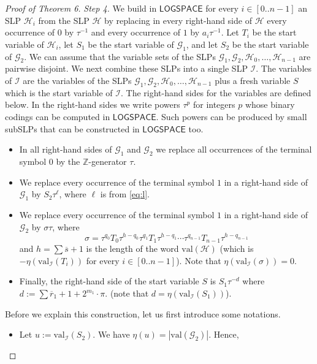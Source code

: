 \documentclass[10pt,a4paper]{article}
\newcommand{\ccinterval}[2]{[{#1}..{#2}]}
\newcommand{\cointerval}[2]{[{#1}..{#2}-1]}
\newcommand{\val}{\mathrm{val}}
\renewcommand{\L}{\ensuremath{\mathsf{LOGSPACE}}\xspace}
\begin{document}
\begin{proof}[Proof of Theorem 6]
\medskip
\noindent
{\em Step 4.}
We build in \L for every $i \in \ccinterval{0}{n-1}$ an
SLP $\mathcal{H}_i$ 
from the SLP $\mathcal{H}$ by replacing in every right-hand side of $\mathcal{H}$ 
every occurrence of $0$  by $\tau^{-1}$ and
every occurrence of $1$  by $a_i \tau^{-1}$.
Let $T_i$ be the start variable of $\mathcal{H}_i$, let $S_1$ be the start variable of $\mathcal{G}_1$, and let
$S_2$ be the start variable of $\mathcal{G}_2$.
We can assume that the variable sets of the SLPs $\mathcal{G}_1, \mathcal{G}_2, \mathcal{H}_0, \ldots, \mathcal{H}_{n-1}$
are pairwise disjoint.  We next combine these SLPs into a single SLP $\mathcal{I}$.
The variables of $\mathcal{I}$ are the variables of 
the SLPs $\mathcal{G}_1, \mathcal{G}_2,  \mathcal{H}_0, \ldots, \mathcal{H}_{n-1}$ plus a fresh variable $S$ which is the start
variable of $\mathcal{I}$. The right-hand sides for the variables are defined below. In the right-hand sides 
we write powers $\tau^p$ for integers $p$
whose binary codings can be computed in \L. Such powers can be produced by small subSLPs that can be constructed in \L too.
\begin{itemize}
\item In all right-hand sides of $\mathcal{G}_1$  and $\mathcal{G}_2$ 
we replace all occurrences of the terminal symbol $0$ by the $\mathbb{Z}$-generator $\tau$. 
\item We replace every
occurrence of the terminal symbol $1$ in a right-hand side of $\mathcal{G}_1$ by $S_2 \tau^\ell$,
where $\ell$ is from \eqref{eq:l}.
\item We  replace every
occurrence of the terminal symbol $1$ in a right-hand side of $\mathcal{G}_2$ by
$\sigma \tau$, where
\begin{equation} \label{eq-sigma}
\sigma = \tau^{q_{0}} T_0 \tau^{h-q_{0}} \tau^{q_{1}} T_1 \tau^{h-q_{1}} \cdots \tau^{q_{n-1}} T_{n-1} \tau^{h-q_{n-1}}
\end{equation}
and $h = \sum \overline{s}+1$ is the length of the word
$\val(\mathcal{H})$ (which is $-\eta(\val_{\mathcal{I}}(T_i))$ for every  $i \in\cointerval{0}{n}$).
Note that $\eta(\val_{\mathcal{I}}(\sigma)) = 0$.
\item Finally, 
the right-hand side of the start variable $S$ is  $S_1 \tau^{-d}$ where $d := \sum \overline{r}_1 + 1 + 2^{m_1} \cdot \pi$.
(note that $d = \eta(\val_{\mathcal{I}}(S_1))$).
\end{itemize}
Before we explain this construction, let us first introduce some notations.
\begin{itemize}
\item Let $u := \val_{\mathcal{I}}(S_2)$. We have $\eta(u) = |\val(\mathcal{G}_2)|$. Hence,

\end{itemize}
\end{proof}
\end{document}
